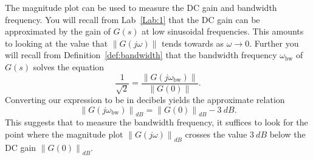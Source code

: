 The magnitude plot can be used to measure the DC gain and bandwidth frequency.
You will recall from Lab~\ref{Lab:1} that the DC gain can be approximated by
the gain of \(G(s)\) at low sinusoidal frequencies. This amounts to looking
at the value that \(\left\| G(j\omega) \right\|\) tends towards as
\(\omega\to 0.\)
%
Further you will recall from Definition~\ref{def:bandwidth} that the
bandwidth frequency \(\omega_\mathrm{bw}\) of \(G(s)\) solves the
equation
\[
  \frac{1}{\sqrt{2}} = \frac{\left\|G(j\omega_\mathrm{bw})\right\|}{\left\|G(0)\right\|}.
\]
Converting our expression to be in decibels yields the approximate relation
\[
  \left\| G(j\omega_\mathrm{bw}) \right\|_{dB} = \left\|G(0)\right\|_{dB} - \SI{3}{dB}.
\]
This suggests that to measure the bandwidth frequency, it suffices to look
for the point where the magnitude plot \(\left\|G(j\omega)\right\|_{dB}\)
crosses the value \(\SI{3}{dB}\) below the DC gain
\(\left\|G(0)\right\|_{dB}.\)


